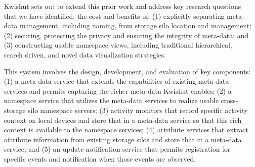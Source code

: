 Kwishut sets out to extend this prior work and address key research questions
that we have identified: the cost and benefits of: (1) explicitly separating
meta-data management, including naming, from storage silo location and
management; (2) securing, protecting the privacy and ensuring the integrity of
meta-data; and (3) constructing usable namespace views, including traditional
hierarchical, search driven, and novel data visualization strategies.

This system involves the design, development, and evaluation of key components:
(1) a meta-data service that extends the capabilities of existing meta-data
services and permits capturing the richer meta-data Kwishut enables; (2) a
namespace service that utilizes the meta-data services to realize usable
cross-storage silo namespace servers; (3) activity monitors that record specific
activity context on local devices and store that in a meta-data service so that
this rich context is available to the namespace services; (4) attribute services
that extract attribute information from existing storage silos and store that in
a meta-data service; and (5) an update notification service that permits
registration for specific events and notification when those events are
observed.

